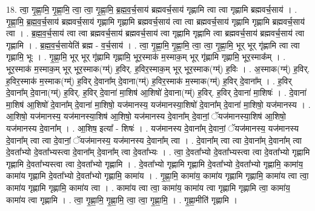 \documentclass[17pt]{extarticle}
\begin{document}
18. त्वा॒ गृ॒ह्णा॒मि॒ गृ॒ह्णा॒मि॒ त्वा॒ त्वा॒ गृ॒ह्णा॒मि॒ ब्र॒ह्म॒व॒र्च॒साय॑ ब्रह्मवर्च॒साय॑ गृह्णामि त्वा त्वा गृह्णामि ब्रह्मवर्च॒साय॑ । . गृ॒ह्णा॒मि॒ ब्र॒ह्म॒व॒र्च॒साय॑ ब्रह्मवर्च॒साय॑ गृह्णामि गृह्णामि ब्रह्मवर्च॒साय॑ त्वा त्वा ब्रह्मवर्च॒साय॑ गृह्णामि गृह्णामि ब्रह्मवर्च॒साय॑ त्वा । . ब्र॒ह्म॒व॒र्च॒साय॑ त्वा त्वा ब्रह्मवर्च॒साय॑ ब्रह्मवर्च॒साय॑ त्वा गृह्णामि गृह्णामि त्वा ब्रह्मवर्च॒साय॑ ब्रह्मवर्च॒साय॑ त्वा गृह्णामि । . ब्र॒ह्म॒व॒र्च॒सायेति॑ ब्रह्म - व॒र्च॒साय॑ । . त्वा॒ गृ॒ह्णा॒मि॒ गृ॒ह्णा॒मि॒ त्वा॒ त्वा॒ गृ॒ह्णा॒मि॒ भूर् भूर् गृ॑ह्णामि त्वा त्वा गृह्णामि॒ भूः । . गृ॒ह्णा॒मि॒ भूर् भूर् गृ॑ह्णामि गृह्णामि॒ भूर॒स्माक॑ म॒स्माक॒म् भूर् गृ॑ह्णामि गृह्णामि॒ भूर॒स्माक᳚म् । . भूर॒स्माक॑ म॒स्माक॒म् भूर् भूर॒स्माक(ग्म्॑) ह॒विर्. ह॒विर॒स्माक॒म् भूर् भूर॒स्माक(ग्म्॑) ह॒विः । . अ॒स्माक(ग्म्॑) ह॒विर्. ह॒विर॒स्माक॑ म॒स्माक(ग्म्॑) ह॒विर् दे॒वाना᳚म् दे॒वाना(ग्म्॑) ह॒विर॒स्माक॑ म॒स्माक(ग्म्॑) ह॒विर् दे॒वाना᳚म् । . ह॒विर् दे॒वाना᳚म् दे॒वाना(ग्म्॑) ह॒विर्. ह॒विर् दे॒वाना॑ मा॒शिष॑ आ॒शिषो॑ दे॒वाना(ग्म्॑) ह॒विर्. ह॒विर् दे॒वाना॑ मा॒शिषः॑ । . दे॒वाना॑ मा॒शिष॑ आ॒शिषो॑ दे॒वाना᳚म् दे॒वाना॑ मा॒शिषो॒ यज॑मानस्य॒ यज॑मानस्या॒शिषो॑ दे॒वाना᳚म् दे॒वाना॑ मा॒शिषो॒ यज॑मानस्य । . आ॒शिषो॒ यज॑मानस्य॒ यज॑मानस्या॒शिष॑ आ॒शिषो॒ यज॑मानस्य दे॒वाना᳚म् दे॒वानां॒ ॅयज॑मानस्या॒शिष॑ आ॒शिषो॒ यज॑मानस्य दे॒वाना᳚म् । . आ॒शिष॒ इत्या᳚ - शिषः॑ । . यज॑मानस्य दे॒वाना᳚म् दे॒वानां॒ ॅयज॑मानस्य॒ यज॑मानस्य दे॒वाना᳚म् त्वा त्वा दे॒वानां॒ ॅयज॑मानस्य॒ यज॑मानस्य दे॒वाना᳚म् त्वा । . दे॒वाना᳚म् त्वा त्वा दे॒वाना᳚म् दे॒वाना᳚म् त्वा दे॒वता᳚भ्यो दे॒वता᳚भ्यस्त्वा दे॒वाना᳚म् दे॒वाना᳚म् त्वा दे॒वता᳚भ्यः । . त्वा॒ दे॒वता᳚भ्यो दे॒वता᳚भ्यस्त्वा त्वा दे॒वता᳚भ्यो गृह्णामि गृह्णामि दे॒वता᳚भ्यस्त्वा त्वा दे॒वता᳚भ्यो गृह्णामि । . दे॒वता᳚भ्यो गृह्णामि गृह्णामि दे॒वता᳚भ्यो दे॒वता᳚भ्यो गृह्णामि॒ कामा॑य॒ कामा॑य गृह्णामि दे॒वता᳚भ्यो दे॒वता᳚भ्यो गृह्णामि॒ कामा॑य । . गृ॒ह्णा॒मि॒ कामा॑य॒ कामा॑य गृह्णामि गृह्णामि॒ कामा॑य त्वा त्वा॒ कामा॑य गृह्णामि गृह्णामि॒ कामा॑य त्वा । . कामा॑य त्वा त्वा॒ कामा॑य॒ कामा॑य त्वा गृह्णामि गृह्णामि त्वा॒ कामा॑य॒ कामा॑य त्वा गृह्णामि । . त्वा॒ गृ॒ह्णा॒मि॒ गृ॒ह्णा॒मि॒ त्वा॒ त्वा॒ गृ॒ह्णा॒मि॒ । . गृ॒ह्णा॒मीति॑ गृह्णामि । \newline
\pagebreak
{}
\end{document}
